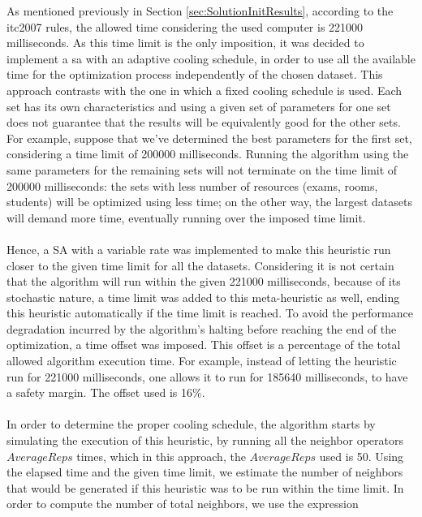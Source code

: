 As mentioned previously in Section \ref{sec:SolutionInitResults}, according to the \gls{itc2007} rules, the allowed time considering the used computer is 221000 milliseconds. As this time limit is the only imposition, it was decided to implement a \gls{sa} with an adaptive cooling schedule, in order to use all the available time for the optimization process independently of the chosen dataset. This approach contrasts with the one in which a fixed cooling schedule is used. Each set has its own characteristics and using a given set of parameters for one set does not guarantee that the results will be equivalently good for the other sets. For example, suppose that we've determined the best parameters for the first set, considering a time limit of 200000 milliseconds. Running the algorithm using the same parameters for the remaining sets will not terminate on the time limit of 200000 milliseconds: the sets with less number of resources (exams, rooms, students) will be optimized using less time; on the other way, the largest datasets will demand more time, eventually running over the imposed time limit.\\
\\
Hence, a SA with a variable rate was implemented to make this heuristic run closer to the given time limit for all the datasets. Considering it is not certain that the algorithm will run within the given 221000 milliseconds, because of its stochastic nature, a time limit was added to this meta-heuristic as well, ending this heuristic automatically if the time limit is reached. To avoid the performance degradation incurred by the algorithm's halting before reaching the end of the optimization, a time offset was imposed. This offset is a percentage of the total allowed algorithm execution time. For example, instead of letting the heuristic run for 221000 milliseconds, one allows it to run for 185640 milliseconds, to have a safety margin. The offset used is 16\%.\\
\\
In order to determine the proper cooling schedule, the algorithm starts by simulating the execution of this heuristic, by running all the neighbor operators $AverageReps$ times, which in this approach, the $AverageReps$ used is 50. Using the elapsed time and the given time limit, we estimate the number of neighbors that would be generated if this heuristic was to be run within the time limit. In order to compute the number of total neighbors, we use the expression 
